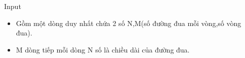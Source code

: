 Input
\begin{itemize}
	\item     Gồm một dòng duy nhất chứa 2 số N,M(số đường đua mỗi vòng,số vòng đua).   
	\item     M dòng tiếp mỗi dòng N số là chiều dài của đường đua.   
\end{itemize}